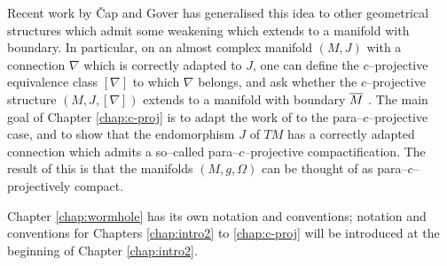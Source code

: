 Recent work by \v Cap and Gover \cite{CG0,CG} has generalised this idea to other geometrical structures which admit some weakening which extends to a manifold with boundary. In particular, on an almost complex manifold $(M,J)$ with a connection $\nabla$ which is correctly adapted to $J$, one can define the $c$--projective equivalence class $[\nabla]$ to which $\nabla$ belongs, and ask whether the $c$--projective structure $(M,J,[\nabla])$ extends to a manifold with boundary $\overline{M}$ \cite{CG}. The main goal of Chapter \ref{chap:c-proj} is to adapt the work of \cite{CG} to the para--$c$--projective case, and to show that the endomorphism $J$ of $TM$ has a correctly adapted connection which admits a so--called para--$c$--projective compactification. The result of this is that the manifolds $(M,g,\Omega)$ can be thought of as para--$c$--projectively compact.

Chapter \ref{chap:wormhole} has its own notation and conventions; notation and conventions for Chapters \ref{chap:intro2} to \ref{chap:c-proj} will be introduced at the beginning of Chapter \ref{chap:intro2}.







